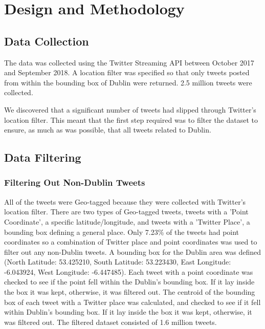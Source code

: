 \section{Design and Methodology}

\subsection{Data Collection}
The data was collected using the Twitter Streaming API between October 2017 and September 2018. A location filter was specified so that only tweets posted from within the bounding box of Dublin were returned. 2.5 million tweets were collected.

We discovered that a significant number of tweets had slipped through Twitter's location filter. This meant that the first step required was to filter the dataset to ensure, as much as was possible, that all tweets related to Dublin.

\subsection{Data Filtering}

\subsubsection{Filtering Out Non-Dublin Tweets}
All of the tweets were Geo-tagged because they were collected with Twitter's location filter. There are two types of Geo-tagged tweets, tweets with a 'Point Coordinate', a specific latitude/longitude, and tweets with a 'Twitter Place', a bounding box defining a general place. Only 7.23\% of the tweets had point coordinates so a combination of Twitter place and point coordinates was used to filter out any non-Dublin tweets. A bounding box for the Dublin area was defined (North Latitude: 53.425210, South Latitude: 53.223430, East Longitude: -6.043924, West Longitude: -6.447485). Each tweet with a point coordinate was checked to see if the point fell within the Dublin's bounding box. If it lay inside the box it was kept, otherwise, it was filtered out. The centroid of the bounding box of each tweet with a Twitter place was calculated, and checked to see if it fell within Dublin's bounding box. If it lay inside the box it was kept, otherwise, it was filtered out. The filtered dataset consisted of 1.6 million tweets.


